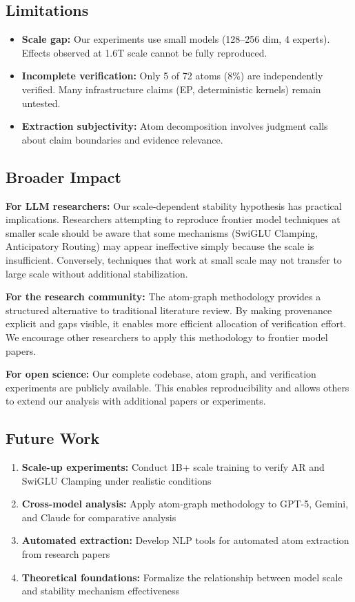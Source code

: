 \documentclass[11pt,a4paper]{article}
\begin{document}
\subsection{Limitations}

\begin{itemize}
    \item \textbf{Scale gap:} Our experiments use small models (128--256 dim, 4 experts). Effects observed at 1.6T scale cannot be fully reproduced.
    \item \textbf{Incomplete verification:} Only 5 of 72 atoms (8\%) are independently verified. Many infrastructure claims (EP, deterministic kernels) remain untested.
    \item \textbf{Extraction subjectivity:} Atom decomposition involves judgment calls about claim boundaries and evidence relevance.
\end{itemize}

\subsection{Broader Impact}

\textbf{For LLM researchers:} Our scale-dependent stability hypothesis has practical implications. Researchers attempting to reproduce frontier model techniques at smaller scale should be aware that some mechanisms (SwiGLU Clamping, Anticipatory Routing) may appear ineffective simply because the scale is insufficient. Conversely, techniques that work at small scale may not transfer to large scale without additional stabilization.

\textbf{For the research community:} The atom-graph methodology provides a structured alternative to traditional literature review. By making provenance explicit and gaps visible, it enables more efficient allocation of verification effort. We encourage other researchers to apply this methodology to frontier model papers.

\textbf{For open science:} Our complete codebase, atom graph, and verification experiments are publicly available. This enables reproducibility and allows others to extend our analysis with additional papers or experiments.

\subsection{Future Work}

\begin{enumerate}
    \item \textbf{Scale-up experiments:} Conduct 1B+ scale training to verify AR and SwiGLU Clamping under realistic conditions
    \item \textbf{Cross-model analysis:} Apply atom-graph methodology to GPT-5, Gemini, and Claude for comparative analysis
    \item \textbf{Automated extraction:} Develop NLP tools for automated atom extraction from research papers
    \item \textbf{Theoretical foundations:} Formalize the relationship between model scale and stability mechanism effectiveness
\end{enumerate}
\end{document}
